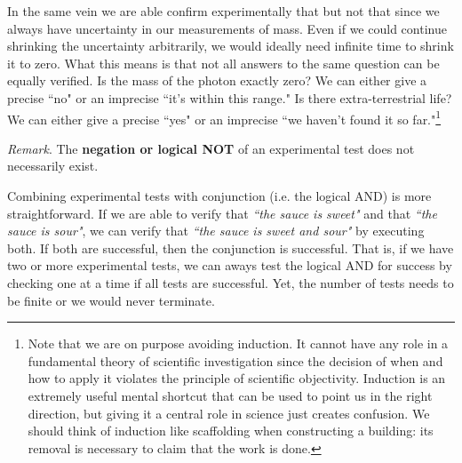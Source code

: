 \documentclass[11pt,letterpaper,fleqn]{memoir} %
\begin{document}
In the same vein we are able confirm experimentally that  but not that  since we always have uncertainty in our measurements of mass. Even if we could continue shrinking the uncertainty arbitrarily, we would ideally need infinite time to shrink it to zero. What this means is that not all answers to the same question can be equally verified. Is the mass of the photon exactly zero? We can either give a precise ``no" or an imprecise ``it's within this range." Is there extra-terrestrial life? We can either give a precise ``yes" or an imprecise ``we haven't found it so far."\footnote{Note that we are on purpose avoiding induction. It cannot have any role in a fundamental theory of scientific investigation since the decision of when and how to apply it violates the principle of scientific objectivity. Induction is an extremely useful mental shortcut that can be used to point us in the right direction, but giving it a central role in science just creates confusion. We should think of induction like scaffolding when constructing a building: its removal is necessary to claim that the work is done.}


\begin{mathSection}
	\emph{Remark}. The \textbf{negation or logical NOT} of an experimental test does not necessarily exist.
\end{mathSection}

Combining experimental tests with conjunction (i.e. the logical AND) is more straightforward. If we are able to verify that \emph{``the sauce is sweet"} and that \emph{``the sauce is sour"}, we can verify that \emph{``the sauce is sweet and sour"} by executing both. If both are successful, then the conjunction is successful. That is, if we have two or more experimental tests, we can aways test the logical AND for success by checking one at a time if all tests are successful. Yet, the number of tests needs to be finite or we would never terminate.
\end{document}
